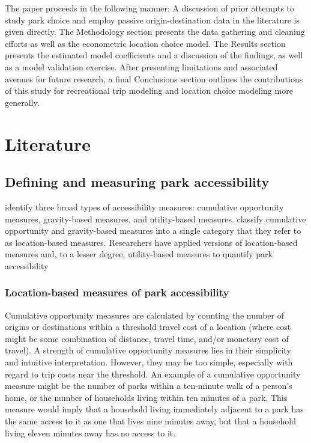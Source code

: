 \documentclass[]{elsarticle} %
\begin{document}
The paper proceeds in the following manner: A discussion of prior attempts to
study park choice and employ passive origin-destination data in the literature
is given directly. The Methodology section presents the data gathering and
cleaning efforts as well as the econometric location choice model. The Results
section presents the estimated model coefficients and a discussion of the
findings, as well as a model validation exercise. After presenting limitations
and associated avenues for future research, a final Conclusions section
outlines the contributions of this study for recreational trip modeling and
location choice modeling more generally.

\hypertarget{literature}{%
\section{Literature}\label{literature}}

\hypertarget{defining-and-measuring-park-accessibility}{%
\subsection{Defining and measuring park accessibility}\label{defining-and-measuring-park-accessibility}}

\citet{Handy1997} identify three broad types of accessibility measures: cumulative
opportunity measures, gravity-based measures, and utility-based measures.
\citet{GEURS2004127} classify cumulative opportunity and gravity-based measures into
a single category that they refer to as location-based measures. Researchers
have applied versions of location-based measures and, to a lesser degree,
utility-based measures to quantify park accessibility

\hypertarget{location-based-measures-of-park-accessibility}{%
\subsubsection{Location-based measures of park accessibility}\label{location-based-measures-of-park-accessibility}}

Cumulative opportunity measures are calculated by counting the number of origins
or destinations within a threshold travel cost of a location (where cost might
be some combination of distance, travel time, and/or monetary cost of travel). A
strength of cumulative opportunity measures lies in their simplicity and
intuitive interpretation. However, they may be too simple, especially with
regard to trip costs near the threshold. An example of a cumulative opportunity
measure might be the number of parks within a ten-minute walk of a person's
home, or the number of households living within ten minutes of a park. This
measure would imply that a household living immediately adjacent to a park has
the same access to it as one that lives nine minutes away, but that a household
living eleven minutes away has no access to it.
\end{document}
